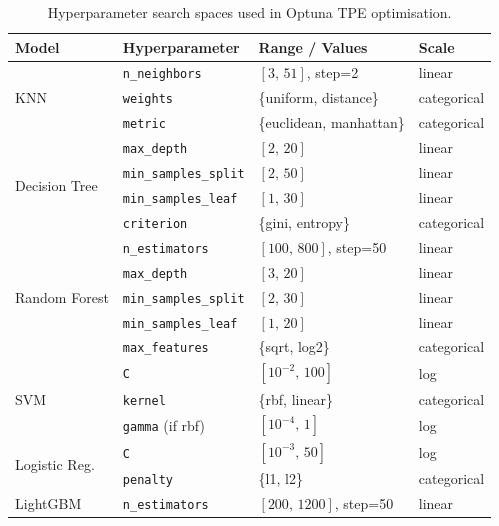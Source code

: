 \begin{table}[htbp]
\centering
\caption[Optuna hyperparameter search spaces]{Hyperparameter search spaces used in Optuna TPE optimisation.}
\label{tab:search_spaces}
\small
\begin{tabular}{l l l l}
\toprule
\textbf{Model} & \textbf{Hyperparameter} & \textbf{Range / Values} & \textbf{Scale} \\
\midrule
\multirow{3}{*}{KNN}
  & \texttt{n\_neighbors}      & $[3,\,51]$, step=2       & linear \\
  & \texttt{weights}           & \{uniform, distance\}    & categorical \\
  & \texttt{metric}            & \{euclidean, manhattan\}  & categorical \\
\midrule
\multirow{4}{*}{Decision Tree}
  & \texttt{max\_depth}        & $[2,\,20]$               & linear \\
  & \texttt{min\_samples\_split} & $[2,\,50]$             & linear \\
  & \texttt{min\_samples\_leaf}  & $[1,\,30]$             & linear \\
  & \texttt{criterion}         & \{gini, entropy\}        & categorical \\
\midrule
\multirow{5}{*}{Random Forest}
  & \texttt{n\_estimators}     & $[100,\,800]$, step=50   & linear \\
  & \texttt{max\_depth}        & $[3,\,20]$               & linear \\
  & \texttt{min\_samples\_split} & $[2,\,30]$             & linear \\
  & \texttt{min\_samples\_leaf}  & $[1,\,20]$             & linear \\
  & \texttt{max\_features}     & \{sqrt, log2\}           & categorical \\
\midrule
\multirow{3}{*}{SVM}
  & \texttt{C}                 & $[10^{-2},\,100]$        & log \\
  & \texttt{kernel}            & \{rbf, linear\}          & categorical \\
  & \texttt{gamma} (if rbf)    & $[10^{-4},\,1]$          & log \\
\midrule
\multirow{2}{*}{Logistic Reg.}
  & \texttt{C}                 & $[10^{-3},\,50]$         & log \\
  & \texttt{penalty}           & \{l1, l2\}               & categorical \\
\midrule
\multirow{9}{*}{LightGBM}
  & \texttt{n\_estimators}     & $[200,\,1200]$, step=50  & linear \\

\end{tabular}
\end{table}
